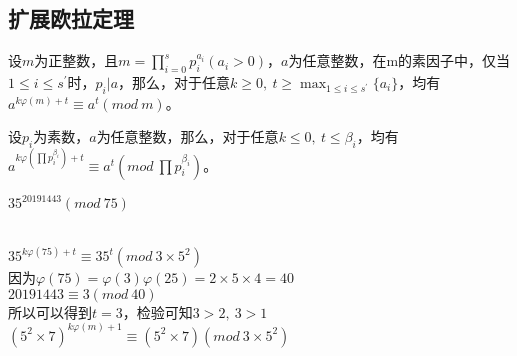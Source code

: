 \documentclass[cn,10pt]{elegantbook}
\begin{document}
\subsection{扩展欧拉定理}
\begin{theorem}[扩展的欧拉定理]
  设$m$为正整数，且$m= \prod_{i=0}^sp_i^{a_i}(a_i > 0)$，$a$为任意整数，在m的素因子中，仅当$1 \leq i \leq s^{\prime}$时，$p_i|a$，那么，对于任意$k \geq 0, \ t \geq \max_{1 \leq i \leq s^{\prime}}\{a_i\} $，均有$a^{k \varphi(m)+t} \equiv a^t(mod \ m)$。
\end{theorem}
\begin{conclusion}
  设$p_i$为素数，$a$为任意整数，那么，对于任意$k \leq 0, \ t \leq \beta_i$，均有$a^{k \varphi(\prod p_i^{\beta_i})+t} \equiv a^t(mod \ \prod p_i^{\beta_i})$。
\end{conclusion}
\vskip 0.5cm
\begin{exercise}
  $35^{20191443}(mod \ 75)$
\end{exercise}
\begin{solution}
  \\$35^{k\varphi(75)+t} \equiv 35^t(mod \ 3 \times 5^2)$
  \\因为$\varphi(75) = \varphi(3) \varphi(25) = 2 \times 5 \times 4 = 40$
  \\$20191443 \equiv 3 (mod \ 40)$
  \\所以可以得到$t = 3$，检验可知$3 >2,\ 3>1$
  \\ $(5^2 \times 7)^{k \varphi(m)+1} \equiv (5^2 \times 7)(mod \ 3 \times 5^2)$
\end{solution}
\vskip 0.5cm
\end{document}
